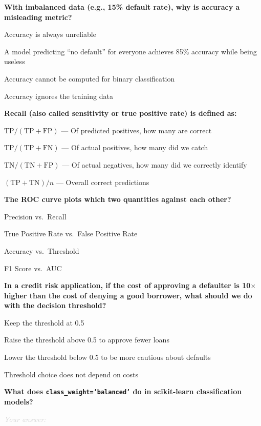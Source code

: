 \documentclass[11pt]{article}
\newcommand{\shortanswer}{%
  \vspace{0.3em}
  \textcolor{LightGray}{\textit{Your answer:} \hrulefill}
  \vspace{0.5em}
}
\begin{document}
\begin{questions}
\item \textbf{With imbalanced data (e.g., 15\% default rate), why is accuracy a misleading metric?}
\begin{options}
  \item Accuracy is always unreliable
  \item A model predicting ``no default'' for everyone achieves 85\% accuracy while being useless
  \item Accuracy cannot be computed for binary classification
  \item Accuracy ignores the training data
\end{options}

\item \textbf{Recall (also called sensitivity or true positive rate) is defined as:}
\begin{options}
  \item $\text{TP} / (\text{TP} + \text{FP})$ --- Of predicted positives, how many are correct
  \item $\text{TP} / (\text{TP} + \text{FN})$ --- Of actual positives, how many did we catch
  \item $\text{TN} / (\text{TN} + \text{FP})$ --- Of actual negatives, how many did we correctly identify
  \item $(\text{TP} + \text{TN}) / n$ --- Overall correct predictions
\end{options}

\item \textbf{The ROC curve plots which two quantities against each other?}
\begin{options}
  \item Precision vs.\ Recall
  \item True Positive Rate vs.\ False Positive Rate
  \item Accuracy vs.\ Threshold
  \item F1 Score vs.\ AUC
\end{options}

\item \textbf{In a credit risk application, if the cost of approving a defaulter is 10$\times$ higher than the cost of denying a good borrower, what should we do with the decision threshold?}
\begin{options}
  \item Keep the threshold at 0.5
  \item Raise the threshold above 0.5 to approve fewer loans
  \item Lower the threshold below 0.5 to be more cautious about defaults
  \item Threshold choice does not depend on costs
\end{options}

\item \textbf{What does \texttt{class\_weight='balanced'} do in scikit-learn classification models?}

\shortanswer

\end{questions}
\end{document}
